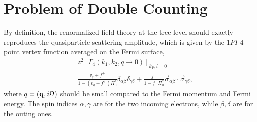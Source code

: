 \documentclass[reprint,amsmath,amssymb,aps,prb]{revtex4-1}
\begin{document}
\section{Problem of Double Counting}

By definition, the renormalized field theory at the tree level should exactly reproduces the quasiparticle scattering amplitude, which is given by the $1PI$ $4$-point vertex function averaged on the Fermi surface,
\begin{align*}
      & z^2 \left[\Gamma_4(k_1, k_2, q\rightarrow 0)\right]_{k_F, l=0}                                                                                                     \\
    = & \frac{v_q+f^+}{1-(v_q+f^+) \Pi_0^*}\delta_{\alpha\beta}\delta_{\gamma\delta}+\frac{f^-}{1-f^- \Pi_0^*}\vec{\sigma}_{\alpha\beta}\cdot \vec{\sigma}_{\gamma\delta},
\end{align*}
where $q=(\mathbf{q}, i\Omega)$ should be small compared to the Fermi momentum and Fermi energy. The spin indices $\alpha, \gamma$ are for the two incoming electrons, while $\beta, \delta$ are for the outing ones.
\end{document}
